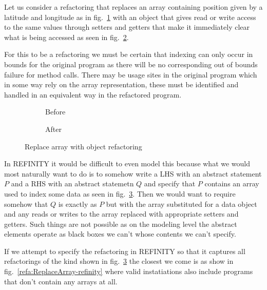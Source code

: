 Let us consider a refactoring that replaces an array containing position given by a latitude and longitude as in fig.~\ref{refa:ReplaceArray-java-before} with an object that gives read or write access to the same values through setters and getters that make it immediately clear what is being accessed as seen in fig.~\ref{refa:ReplaceArray-java-after}.

For this to be a refactoring we must be certain that indexing can only occur in bounds for the original program as there will be no corresponding out of bounds failure for method calls. There may be usage sites in the original program which in some way rely on the array representation, these must be identified and handled in an equivalent way in the refactored program.

\begin{figure}
  \begin{subfigure}[h]{.45\linewidth} 
    
    \caption{Before}
    \label{refa:ReplaceArray-java-before}   
  \end{subfigure}\hspace{1cm}
  \begin{subfigure}[h]{.45\linewidth}
    
    \caption{After}
    \label{refa:ReplaceArray-java-after}
  \end{subfigure}
  \caption{Replace array with object refactoring}
  \label{refa:ReplaceArray-java}
\end{figure}

In REFINITY it would be difficult to even model this because what we would most naturally want to do is to somehow write a LHS with an abstract statement $P$ and a RHS with an abstract statemetn $Q$ and specify that $P$ contains an array used to index some data as seen in fig.~\ref{refa:ReplaceArray-java}. Then we would want to require somehow that $Q$ is exactly as $P$ but with the array substituted for a data object and any reads or writes to the array replaced with appropriate setters and getters. Such things are not possible as on the modeling level the abstract elements operate as black boxes we can't whose contents we can't specify.

If we attempt to specify the refactoring in REFINITY so that it captures all refactorings of the kind shown in fig.~\ref{refa:ReplaceArray-java} the closest we come is as show in fig.~\ref{refa:ReplaceArray-refinity} where valid instatiations
also include programs that don't contain any arrays at all.

